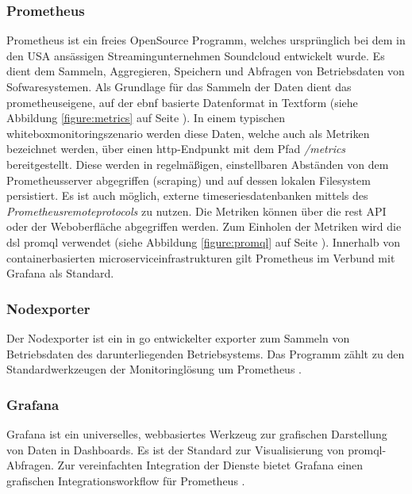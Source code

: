 \documentclass[11pt,a4paper]{article}
\begin{document}
\subsubsection{Prometheus}
\label{sssec:prometheus}
Prometheus ist ein freies OpenSource Programm, welches ursprünglich bei dem in den USA ansässigen Streamingunternehmen
Soundcloud entwickelt wurde. Es dient dem Sammeln, Aggregieren, Speichern und Abfragen von Betriebsdaten von Sofwaresystemen.
Als Grundlage für das Sammeln der Daten dient das prometheuseigene, auf der \gls{ebnf} basierte Datenformat in Textform
(siehe Abbildung \ref{figure:metrics} auf Seite \pageref{figure:metrics}).
In einem typischen \gls{whiteboxmonitoring}szenario werden diese Daten, welche auch als Metriken bezeichnet werden,
über einen \gls{http}-Endpunkt mit dem Pfad \emph{/metrics} bereitgestellt.
Diese werden in regelmäßigen, einstellbaren Abständen von dem Prometheusserver abgegriffen (scraping) und auf dessen lokalen
Filesystem persistiert. Es ist auch möglich, externe \gls{timeseries}datenbanken mittels des \emph{Prometheusremoteprotocols}
zu nutzen. Die Metriken können über die \gls{rest} API oder der Weboberfläche abgegriffen werden.
Zum Einholen der Metriken wird die \gls{dsl} \gls{promql} verwendet \cite{prometheus}
(siehe Abbildung \ref{figure:promql} auf Seite \pageref{figure:promql}).
Innerhalb von  containerbasierten \gls{microservice}infrastrukturen gilt Prometheus im Verbund mit Grafana als Standard.
\subsubsection{Nodexporter}
\label{sssec:nodexporter}
Der Nodexporter ist ein in \gls{go} entwickelter \gls{exporter} zum Sammeln von Betriebsdaten des
darunterliegenden Betriebsystems. Das Programm zählt zu den Standardwerkzeugen der Monitoringlösung um Prometheus \cite{exporter}.
\subsubsection{Grafana}
\label{sssec:grafana}
Grafana ist ein universelles, webbasiertes Werkzeug zur grafischen Darstellung von Daten in Dashboards.
Es ist der Standard zur Visualisierung von \gls{promql}-Abfragen. Zur vereinfachten Integration der Dienste bietet
Grafana einen grafischen Integrationsworkflow für Prometheus \cite{grafana}.
\end{document}

